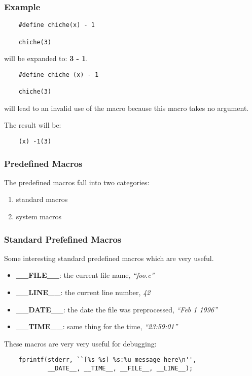 
\begin{frame}[containsverbatim]
  \frametitle{Example}

  \begin{verbatim}
    #define chiche(x) - 1

    chiche(3)
  \end{verbatim}

  will be expanded to: \textbf{3 - 1}.

  \begin{verbatim}
    #define chiche (x) - 1

    chiche(3)
  \end{verbatim}

  will lead to an invalid use of the macro because this macro takes no
  argument.

  \nl

  The result will be:

  \begin{verbatim}
    (x) -1(3)
  \end{verbatim}
\end{frame}


\begin{frame}
  \frametitle{Predefined Macros}

  The predefined macros fall into two categories:

  \begin{enumerate}
    \item
      standard macros
    \item
      system macros
  \end{enumerate}
\end{frame}


\begin{frame}[containsverbatim]
  \frametitle{Standard Prefefined Macros}

  Some interesting standard predefined macros which are very useful.

  \begin{itemize}
    \item
      \textbf{\_\_FILE\_\_}: the current file name, \textit{``foo.c''}
    \item
      \textbf{\_\_LINE\_\_}: the current line number, \textit{42}
    \item
      \textbf{\_\_DATE\_\_}: the date the file was preprocessed,
      \textit{``Feb 1 1996''}
    \item
      \textbf{\_\_TIME\_\_}: same thing for the time, \textit{``23:59:01''}
  \end{itemize}

  These macros are very very useful for debugging:

  \begin{verbatim}
    fprintf(stderr, ``[%s %s] %s:%u message here\n'', 
            __DATE__, __TIME__, __FILE__, __LINE__);
  \end{verbatim}
\end{frame}

